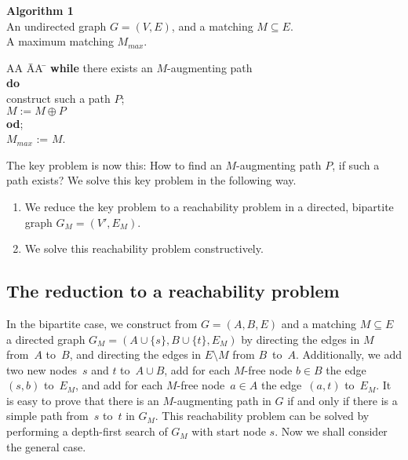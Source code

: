 \documentclass[12pt,twoside,a4paper]{article}
\begin{document}
\medskip
\noindent
{\bf Algorithm 1} \\
 An undirected graph $G=(V,E)$, and a matching
$M \subseteq E$. \\
 A maximum matching $M_{max}$. \\
\vspace{-0.3cm}
\begin{tabbing}
AA \= AA \= \kill
{\bf while} there exists an $M$-augmenting path \\
\> {\bf do} \\
        \>  \> construct such a path $P$; \\
        \>  \> $M:= M\oplus P$ \\
\> {\bf od}; \\
$M_{max}$ := $M$.
\end{tabbing}

The key problem is now this: How to find an $M$-augmenting path $P$, if such 
a path exists?
We solve this key problem in the following way.
\begin{enumerate}
\item We reduce the key problem to a reachability problem in a directed,
bipartite graph $G_M = (V',E_M)$.
\item We solve this reachability problem constructively.
\end{enumerate}

\subsection{The reduction to a reachability problem}

In the bipartite case, we construct from $G=(A,B,E)$ and a matching 
$M\subseteq E$ a directed graph $G_M=(A \cup \{s\}, B \cup \{t\},E_M)$ by directing 
the edges in $M$ from~$A$ to~$B$,
and directing the edges in $E\setminus M$ from $B$~to~$A$. Additionally, we add
two new
nodes~$s$ and $t$ to~$A\cup B$, add for each $M$-free node $b\in B$ the edge
$(s,b)$ to~$E_M$, and add for each $M$-free node~$a\in A$ the edge~$(a,t)$
to~$E_M$.
It is easy to prove that there is an $M$-augmenting path in $G$ if and
only if there is a simple path from~$s$ to~$t$ in $G_M$.
This reachability problem can be solved by performing a depth-first search 
of $G_M$ with start node $s$. Now we shall consider the general case.
\end{document}
